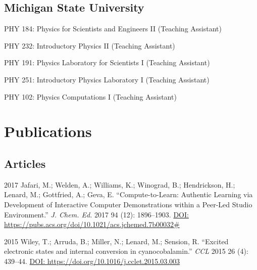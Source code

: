 \documentclass[12pt,letterpaper]{report}
\newcommand{\listitemspace}{0.25em}
\renewenvironment{itemize}
{\begin{list}{}{\setlength{\leftmargin}{0em}
            \setlength{\parskip}{0em}
            \setlength{\itemsep}{\listitemspace}
            \setlength{\parsep}{\listitemspace}}}
{\end{list}}
\begin{document}
\subsection*{Michigan State University}

\begin{itemize}

        \item PHY 184: Physics for Scientists and Engineers II (Teaching Assistant)
        
        \item PHY 232: Introductory Physics II (Teaching Assistant)
        
        \item PHY 191: Physics Laboratory for Scientists I (Teaching Assistant)
        
        \item PHY 251: Introductory Physics Laboratory I (Teaching Assistant)
        
        \item PHY 102: Physics Computations I (Teaching Assistant)

\end{itemize}



\section*{Publications}

\subsection*{Articles}

\begin{tablist}
   
        \item[2017] \tab Jafari, M.; Welden, A.; Williams, K.; Winograd, B.; Hendrickson, H.; Lenard, M.; Gottfried, A.; Geva, E. \enquote{Compute-to-Learn: Authentic Learning via Development of Interactive Computer Demonstrations within a Peer-Led Studio Environment.} \textit{J. Chem. Ed.} 2017 94 (12): 1896--1903. \href{https://pubs.acs.org/doi/10.1021/acs.jchemed.7b00032\#}{DOI: https://pubs.acs.org/doi/10.1021/acs.jchemed.7b00032\#}

        \item[2015] \tab Wiley, T.; Arruda, B.; Miller, N.; Lenard, M.; Sension, R. \enquote{Excited electronic states and internal conversion in cyanocobalamin.} \textit{CCL} 2015 26 (4): 439--44. \href{https://doi.org/10.1016/j.cclet.2015.03.003}{DOI: https://doi.org/10.1016/j.cclet.2015.03.003}

\end{tablist}
\end{document}
